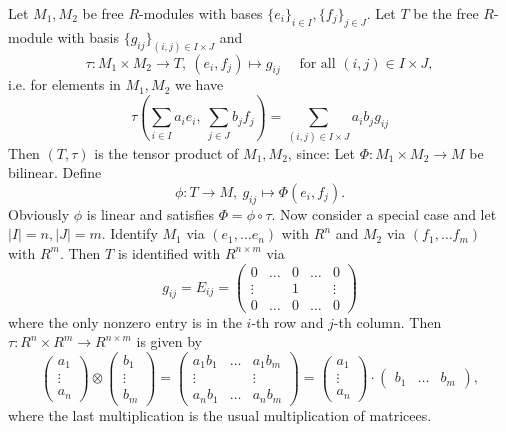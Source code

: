 \documentclass[11pt]{book}
\theoremstyle{nonumberbreak}
\newenvironment{ex}[1][]{\ifthenelse{\equal{#1}{}}{\example}{\example[#1]}\rm}{\endexample}
\begin{document}
\begin{spacing}{1.3}
\begin{ex}%
Let $M_1, M_2$ be free $R$-modules with bases $\{e_i\}_{i \in I}, \{f_j\}_{j \in J}$. Let $T$ be the free $R$-module with basis $\{g_{ij}\}_{(i,j) \in I \times J}$ and $$\tau: M_1 \times M_2 \longrightarrow T, \ (e_i, f_j) \mapsto g_{ij} \quad \textrm{ for all } (i,j) \in I \times J,$$
i.e. for elements in $M_1, M_2$ we have
$$\tau \left(\sum_{i\in I} a_i e_i, \ \sum_{j \in J} b_j f_j \right) = \sum_{(i,j) \in I \times J} a_i b_j g_{ij}$$
Then $(T, \tau)$ is the tensor product of $M_1, M_2$, since:
Let $\Phi: M_1 \times M_2 \longrightarrow M$ be bilinear.
Define $$\phi: T \longrightarrow M, \ g_{ij} \mapsto \Phi(e_i, f_j).$$
Obviously $\phi$ is linear and satisfies $\Phi=\phi \circ \tau$.
Now consider a special case and let $|I|=n, |J|=m$. 
Identify $M_1$ via $ (e_1, \ldots e_n)$ with $R^n$ and $M_2$ via $(f_1, \ldots f_m)$ with $R^m$. 
Then $T$ is identified with $R^{n\times m}$ via
$$g_{ij}=E_{ij}=\begin{pmatrix} 0 & \ldots & 0 & \ldots & 0  \\ \vdots & & 1 & & \vdots \\ 0 & \ldots & 0 & \ldots & 0 \end{pmatrix}$$
where the only nonzero entry is in the $i$-th row and $j$-th column. Then $\tau: R^n \times R^m \longrightarrow R^{n\times m}$ is given by
$$\begin{pmatrix} a_1 \\ \vdots \\ a_n \end{pmatrix} \otimes \begin{pmatrix} b_1 \\ \vdots \\ b_m \end{pmatrix} = \begin{pmatrix} a_1b_1 & \ldots & a_1b_m \\ \vdots & & \vdots \\ a_nb_1 & \ldots & a_nb_m \end{pmatrix} = \begin{pmatrix} a_1 \\ \vdots \\ a_n \end{pmatrix} \cdot \begin{pmatrix} b_1 & \ldots & b_m \end{pmatrix},$$
where the last multiplication is the usual multiplication of matricees.
\end{ex}




\end{spacing}
\end{document}
